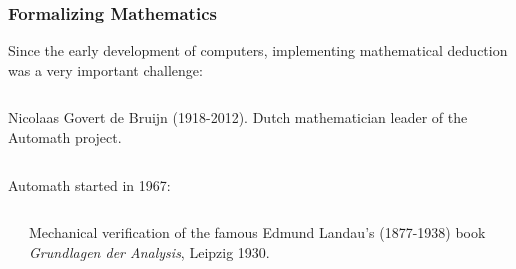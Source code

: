 \documentclass[10pt]{beamer}
\begin{document}
\begin{frame}
\frametitle{Formalizing Mathematics}
Since the early development of computers, implementing mathematical
deduction was a very important challenge:

\begin{columns}
\begin{column}{0.5\textwidth}  Nicolaas Govert de Bruijn
  (1918-2012). Dutch mathematician leader of the  {\color{blue}
    Automath} project.\end{column}
\begin{column}{0.1\textwidth}   \end{column}\end{columns}

\vspace{1cm}


{\color{blue} Automath} started in 1967:  

\vspace{3mm}

\begin{columns}
\begin{column}{0.1\textwidth}   \end{column} \begin{column}{0.5\textwidth} Mechanical verification of the famous Edmund
Landau's  (1877-1938) book \emph{Grundlagen der Analysis}, Leipzig
1930.\end{column}
\begin{column}{0.1\textwidth}   \end{column} 
\end{columns}

 


\end{frame}
\end{document}
